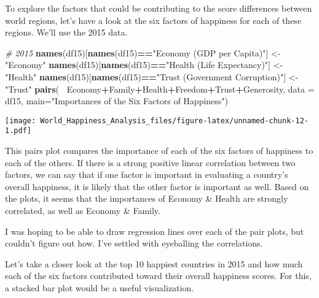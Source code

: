 \documentclass[]{article}
\newenvironment{Shaded}{\begin{snugshade}}{\end{snugshade}}
\newcommand{\CommentTok}[1]{\textcolor[rgb]{0.56,0.35,0.01}{\textit{#1}}}
\newcommand{\DataTypeTok}[1]{\textcolor[rgb]{0.13,0.29,0.53}{#1}}
\newcommand{\KeywordTok}[1]{\textcolor[rgb]{0.13,0.29,0.53}{\textbf{#1}}}
\newcommand{\NormalTok}[1]{#1}
\newcommand{\OperatorTok}[1]{\textcolor[rgb]{0.81,0.36,0.00}{\textbf{#1}}}
\newcommand{\StringTok}[1]{\textcolor[rgb]{0.31,0.60,0.02}{#1}}
\begin{document}
To explore the factors that could be contributing to the score
differences between world regions, let's have a look at the six factors
of happiness for each of these regions. We'll use the 2015 data.

\begin{Shaded}
\begin{Highlighting}[]
\CommentTok{# 2015}
\KeywordTok{names}\NormalTok{(df15)[}\KeywordTok{names}\NormalTok{(df15)}\OperatorTok{==}\StringTok{"Economy (GDP per Capita)"}\NormalTok{] <-}\StringTok{ "Economy"}
\KeywordTok{names}\NormalTok{(df15)[}\KeywordTok{names}\NormalTok{(df15)}\OperatorTok{==}\StringTok{"Health (Life Expectancy)"}\NormalTok{] <-}\StringTok{ "Health"}
\KeywordTok{names}\NormalTok{(df15)[}\KeywordTok{names}\NormalTok{(df15)}\OperatorTok{==}\StringTok{"Trust (Government Corruption)"}\NormalTok{] <-}\StringTok{ "Trust"}
\KeywordTok{pairs}\NormalTok{(}\OperatorTok{~}\StringTok{ }\NormalTok{Economy}\OperatorTok{+}\NormalTok{Family}\OperatorTok{+}\NormalTok{Health}\OperatorTok{+}\NormalTok{Freedom}\OperatorTok{+}\NormalTok{Trust}\OperatorTok{+}\NormalTok{Generosity, }\DataTypeTok{data =}\NormalTok{ df15, }
      \DataTypeTok{main=}\StringTok{"Importances of the Six Factors of Happiness"}\NormalTok{)}
\end{Highlighting}
\end{Shaded}

\texttt{[image: World\_Happiness\_Analysis\_files/figure-latex/unnamed-chunk-12-1.pdf]}

This pairs plot compares the importance of each of the six factors of
happiness to each of the others. If there is a strong positive linear
correlation between two factors, we can say that if one factor is
important in evaluating a country's overall happiness, it is likely that
the other factor is important as well. Based on the plots, it seems that
the importances of Economy \& Health are strongly correlated, as well as
Economy \& Family.

I was hoping to be able to draw regression lines over each of the pair
plots, but couldn't figure out how. I've settled with eyeballing the
correlations.

Let's take a closer look at the top 10 happiest countries in 2015 and
how much each of the six factors contributed toward their overall
happiness scores. For this, a stacked bar plot would be a useful
visualization.
\end{document}
